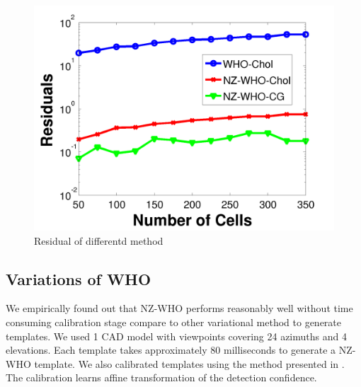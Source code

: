 \documentclass[10pt,twocolumn,letterpaper]{article}
\begin{document}
\begin{figure}[t]
  \centering
  \includegraphics[width=0.5\linewidth]{residual}
  \caption{Residual of differentd method}
  \label{fig:whotime}
\end{figure}

\subsection{Variations of WHO}

We empirically found out that NZ-WHO performs reasonably well without time consuming calibration stage compare to other variational method to generate templates. We used 1 CAD model with viewpoints covering 24 azimuths and 4 elevations. Each template takes approximately 80 milliseconds to generate a NZ-WHO template. We also calibrated templates using the method presented in \cite{Aubry14}. The calibration learns affine transformation of the detection confidence.%
\end{document}

